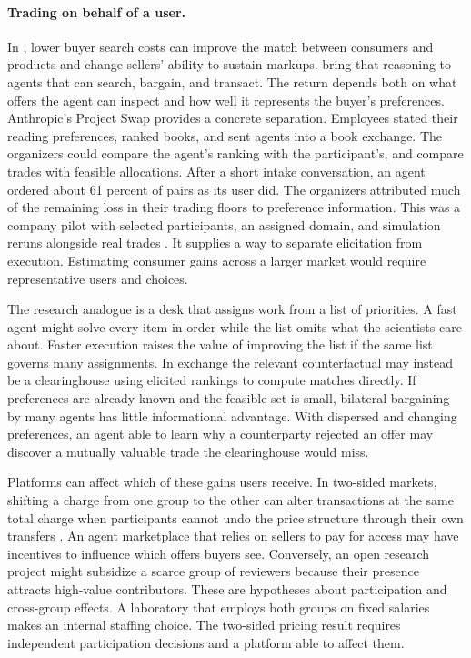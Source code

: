 \documentclass[11pt,letterpaper]{article}
\begin{document}
\paragraph{Trading on behalf of a user.}
In \citet{bakos}, lower buyer search costs can improve the match between consumers and products and change sellers' ability to sustain markups. \citet{shahidi} bring that reasoning to agents that can search, bargain, and transact. The return depends both on what offers the agent can inspect and how well it represents the buyer's preferences. Anthropic's Project Swap provides a concrete separation. Employees stated their reading preferences, ranked books, and sent agents into a book exchange. The organizers could compare the agent's ranking with the participant's, and compare trades with feasible allocations. After a short intake conversation, an agent ordered about 61 percent of pairs as its user did. The organizers attributed much of the remaining loss in their trading floors to preference information. This was a company pilot with selected participants, an assigned domain, and simulation reruns alongside real trades \citep{swap}. It supplies a way to separate elicitation from execution. Estimating consumer gains across a larger market would require representative users and choices.

The research analogue is a desk that assigns work from a list of priorities. A fast agent might solve every item in order while the list omits what the scientists care about. Faster execution raises the value of improving the list if the same list governs many assignments. In exchange the relevant counterfactual may instead be a clearinghouse using elicited rankings to compute matches directly. If preferences are already known and the feasible set is small, bilateral bargaining by many agents has little informational advantage. With dispersed and changing preferences, an agent able to learn why a counterparty rejected an offer may discover a mutually valuable trade the clearinghouse would miss.

Platforms can affect which of these gains users receive. In two-sided markets, shifting a charge from one group to the other can alter transactions at the same total charge when participants cannot undo the price structure through their own transfers \citep{rochet}. An agent marketplace that relies on sellers to pay for access may have incentives to influence which offers buyers see. Conversely, an open research project might subsidize a scarce group of reviewers because their presence attracts high-value contributors. These are hypotheses about participation and cross-group effects. A laboratory that employs both groups on fixed salaries makes an internal staffing choice. The two-sided pricing result requires independent participation decisions and a platform able to affect them.
\end{document}
